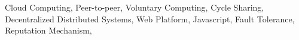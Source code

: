 
% 
% 

\begin{keywords}
Cloud Computing, Peer-to-peer, Voluntary Computing, Cycle Sharing, Decentralized Distributed Systems, Web Platform, Javascript, Fault Tolerance, Reputation Mechanism, 
\end{keywords}